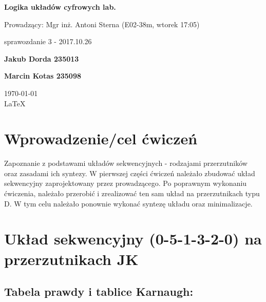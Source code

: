 \documentclass[12pt,a4paper]{article}
\begin{document}
	
	\begin{titlepage}
		
		\centering
		{\huge\bfseries Logika układów cyfrowych lab.\par}
		
		\vspace{0.5cm}
		Prowadzący: Mgr inż. Antoni Sterna (E02-38m, wtorek 17:05) \\
	
		\vspace{1.1cm}
		{\Large sprawozdanie 3 - 2017.10.26\par}
		\vfill
		
		{\large\bfseries Jakub Dorda 235013\par}
		{\large\bfseries Marcin Kotas 235098\par}
		
		\vspace{1cm}
		\today \\ \LaTeX
		
		\restoregeometry
	\end{titlepage}

	
	\section{Wprowadzenie/cel ćwiczeń}
	
	Zapoznanie z podstawami układów sekwencyjnych - rodzajami przerzutników oraz zasadami ich syntezy.
	W pierwszej części ćwiczeń należało zbudować układ sekwencyjny zaprojektowany przez prowadzącego. Po poprawnym wykonaniu
	ćwiczenia, należało przerobić i zrealizować ten sam układ na przerzutnikach typu D. W tym celu należało ponownie wykonać syntezę
	układu oraz minimalizacje.
		
	\section{Układ sekwencyjny (0-5-1-3-2-0) na przerzutnikach JK}
		
		\subsection{Tabela prawdy i tablice Karnaugh:}
			
\end{document}
